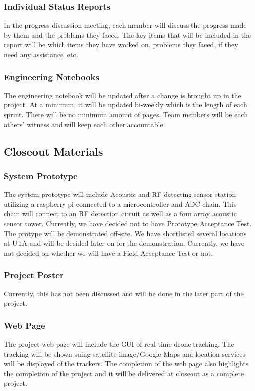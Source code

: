 \subsubsection{Individual Status Reports}
In the progress discussion meeting, each member will discuss the progress made by them and the problems they faced. The key items that will be included in the report will be which items they have worked on, problems they faced, if they need any assistance, etc.

\subsubsection{Engineering Notebooks}
The engineering notebook will be updated after a change is brought up in the project. At a minimum, it will be updated bi-weekly which is the length of each sprint. There will be no minimum amount of pages. Team members will be each others' witness and will keep each other accountable.

\subsection{Closeout Materials}
\subsubsection{System Prototype}
The system prototype will include Acoustic and RF detecting sensor station utilizing a raspberry pi connected to a microcontroller and ADC chain. This chain will connect to an RF detection circuit as well as a four array acoustic sensor tower. Currently, we have decided not to have Prototype Acceptance Test. The protype will be demonstrated off-site. We have shortlisted several locations at UTA and will be decided later on for the demonstration. Currently, we have not decided on whether we will have a Field Acceptance Test or not.

\subsubsection{Project Poster}
Currently, this has not been discussed and will be done in the later part of the project.

\subsubsection{Web Page}
The project web page will include the GUI of real time drone tracking. The tracking will be shown suing satellite image/Google Maps and location services will be displayed of the trackers. The completion of the web page also highlights the completion of the project and it will be delivered at closeout as a complete project.

